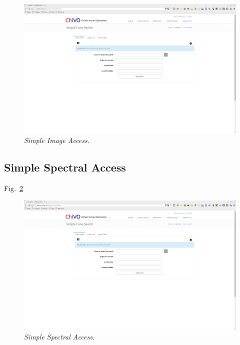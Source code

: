 \begin{figure}[ht!]
    \begin{center}
	\includegraphics[scale=.2]{img/sia}
    \end{center}
    \caption{\emph{Simple Image Access}.}\label{img:sia}
\end{figure}



\subsection{Simple Spectral Access}

Fig.~\ref{img:ssa}

\begin{figure}[ht!]
    \begin{center}
	\includegraphics[scale=.2]{img/ssa}
    \end{center}
    \caption{\emph{Simple Spectral Access}.}\label{img:ssa}
\end{figure}

